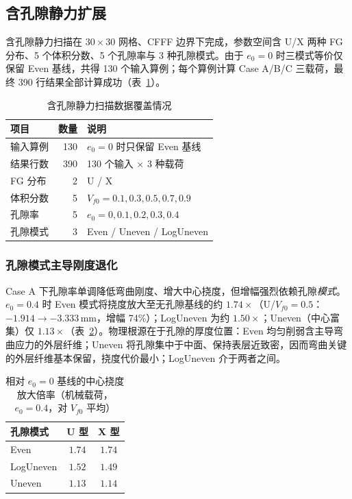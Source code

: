 \documentclass[11pt,a4paper]{ctexart}
\begin{document}
\subsection{含孔隙静力扩展}

含孔隙静力扫描在 $30\times30$ 网格、CFFF 边界下完成，参数空间含 U/X 两种 FG 分布、5 个体积分数、5 个孔隙率与 3 种孔隙模式。由于 $e_0=0$ 时三模式等价仅保留 Even 基线，共得 130 个输入算例；每个算例计算 Case A/B/C 三载荷，最终 390 行结果全部计算成功（表~\ref{tab:porous-coverage}）。

\begin{table}[H]
\centering
\caption{含孔隙静力扫描数据覆盖情况}
\label{tab:porous-coverage}
\begin{tabular}{lrl}
\toprule
\textbf{项目} & \textbf{数量} & \textbf{说明} \\
\midrule
输入算例 & 130 & $e_0=0$ 时只保留 Even 基线 \\
结果行数 & 390 & 130 个输入 $\times$ 3 种载荷 \\
FG 分布 & 2 & U / X \\
体积分数 & 5 & $V_{f0}=0.1,0.3,0.5,0.7,0.9$ \\
孔隙率 & 5 & $e_0=0,0.1,0.2,0.3,0.4$ \\
孔隙模式 & 3 & Even / Uneven / LogUneven \\
\bottomrule
\end{tabular}
\end{table}

\subsubsection{孔隙模式主导刚度退化}

Case A 下孔隙率单调降低弯曲刚度、增大中心挠度，但增幅强烈依赖孔隙\emph{模式}。$e_0=0.4$ 时 Even 模式将挠度放大至无孔隙基线的约 $1.74\times$（U/$V_{f0}=0.5$：$-1.914 \to -3.333$\,mm，增幅 74\%）；LogUneven 为约 $1.50\times$；Uneven（中心富集）仅 $1.13\times$（表~\ref{tab:defl-ratio}）。物理根源在于孔隙的厚度位置：Even 均匀削弱含主导弯曲应力的外层纤维；Uneven 将孔隙集中于中面、保持表层近致密，因而弯曲关键的外层纤维基本保留，挠度代价最小；LogUneven 介于两者之间。

\begin{table}[H]
\centering
\caption{相对 $e_0=0$ 基线的中心挠度放大倍率（机械载荷，$e_0=0.4$，对 $V_{f0}$ 平均）}
\label{tab:defl-ratio}
\begin{tabular}{lcc}
\toprule
\textbf{孔隙模式} & \textbf{U 型} & \textbf{X 型} \\
\midrule
Even        & $1.74$ & $1.74$ \\
LogUneven   & $1.52$ & $1.49$ \\
Uneven      & $1.13$ & $1.14$ \\
\bottomrule
\end{tabular}
\end{table}
\end{document}
